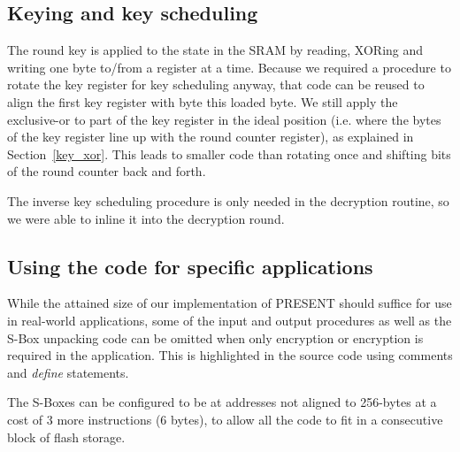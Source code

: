 \documentclass[11pt]{article}
\begin{document}
\subsection{Keying and key scheduling}
The round key is applied to the state in the SRAM by reading, XORing and writing one byte to/from a register at a time.
Because we required a procedure to rotate the key register for key scheduling anyway, that code can be reused to align the first key register with byte this loaded byte.
We still apply the exclusive-or to part of the key register in the ideal position (i.e. where the bytes of the key register line up with the round counter register), as explained in Section~\ref{key_xor}.
This leads to smaller code than rotating once and shifting bits of the round counter back and forth.

The inverse key scheduling procedure is only needed in the decryption routine, so we were able to inline it into the decryption round.

\subsection{Using the code for specific applications}
While the attained size of our implementation of PRESENT should suffice for use in real-world applications, some of the input and output procedures as well as the S-Box unpacking code can be omitted when only encryption or encryption is required in the application.
This is highlighted in the source code using comments and \textit{define} statements.

The S-Boxes can be configured to be at addresses not aligned to 256-bytes at a cost of 3 more instructions (6 bytes), to allow all the code to fit in a consecutive block of flash storage.
\end{document}
